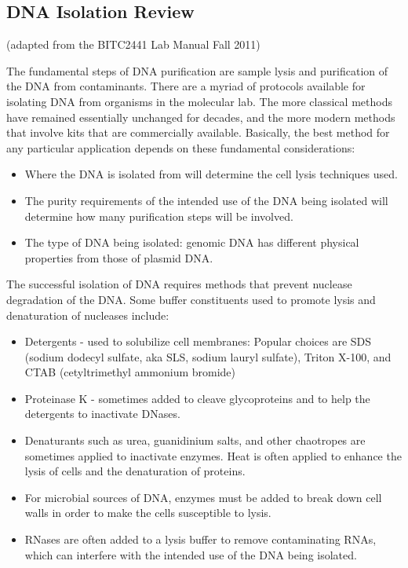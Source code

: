 \documentclass[11pt, oneside]{article}
\begin{document}
	\newpage

	\subsection{DNA Isolation Review}

		(adapted from the BITC2441 Lab Manual Fall 2011)

		The fundamental steps of DNA purification are sample lysis and purification of the DNA from contaminants. There are a myriad of protocols 			available for isolating DNA from organisms in the molecular lab. The more classical methods have remained essentially unchanged for decades,		and the more modern methods that involve kits that are commercially available. Basically, the best method for any particular application depends 		on these fundamental considerations: 

		\begin{itemize}
			\itemsep0em
			\item Where the DNA is isolated from will determine the cell lysis techniques used. 
			\item The purity requirements of the intended use of the DNA being isolated will determine how many purification steps will be involved. 
			\item The type of DNA being isolated: genomic DNA has different physical properties from those of plasmid DNA. 
		\end{itemize}

		The successful isolation of DNA requires methods that prevent nuclease degradation of the DNA. Some buffer constituents used to promote lysis 		and denaturation of nucleases include: 

		\begin{itemize}
			\itemsep0em	
			\item Detergents - used to solubilize cell membranes: Popular choices are SDS (sodium dodecyl sulfate, aka SLS, sodium lauryl sulfate), 				Triton X-100, and CTAB (cetyltrimethyl ammonium bromide) 
			\item Proteinase K - sometimes added to cleave glycoproteins and to help the detergents to inactivate DNases. 
			\item Denaturants such as urea, guanidinium salts, and other chaotropes are sometimes applied to inactivate enzymes. Heat is often 				applied to enhance the lysis of cells and the denaturation of proteins. 
			\item For microbial sources of DNA, enzymes must be added to break down cell walls in order to make the cells susceptible to lysis. 
			\item RNases are often added to a lysis buffer to remove contaminating RNAs, which can interfere with the intended use of the DNA being 			isolated. 	
		\end{itemize}
\end{document}
